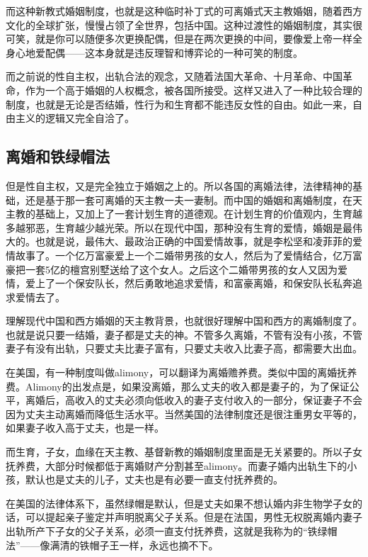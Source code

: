 而这种新教式婚姻制度，也就是这种临时补丁式的可离婚式天主教婚姻，随着西方文化的全球扩张，慢慢占领了全世界，包括中国。这种过渡性的婚姻制度，其实很可笑，就是你可以随便多次更换配偶，但是在两次更换的中间，要像爱上帝一样全身心地爱配偶——这本身就是违反理智和博弈论的一种可笑的制度。

而之前说的性自主权，出轨合法的观念，又随着法国大革命、十月革命、中国革命，作为一个高于婚姻的人权概念，被各国所接受。这样又进入了一种比较合理的制度，也就是无论是否结婚，性行为和生育都不能违反女性的自由。如此一来，自由主义的逻辑又完全自洽了。

\subsection{离婚和铁绿帽法}

但是性自主权，又是完全独立于婚姻之上的。所以各国的离婚法律，法律精神的基础，还是基于那一套可离婚的天主教一夫一妻制。而中国的婚姻和离婚制度，在天主教的基础上，又加上了一套计划生育的道德观。在计划生育的价值观内，生育越多越邪恶，生育越少越光荣。所以在现代中国，那种没有生育的爱情，婚姻是最伟大的。也就是说，最伟大、最政治正确的中国爱情故事，就是李松坚和凌菲菲的爱情故事了。一个亿万富豪爱上一个二婚带男孩的女人，然后为了爱情结合，亿万富豪把一套5亿的檀宫别墅送给了这个女人。之后这个二婚带男孩的女人又因为爱情，爱上了一个保安队长，然后勇敢地追求爱情，和富豪离婚，和保安队长私奔追求爱情去了。

理解现代中国和西方婚姻的天主教背景，也就很好理解中国和西方的离婚制度了。也就是说只要一结婚，妻子都是丈夫的神。不管多久离婚，不管有没有小孩，不管妻子有没有出轨，只要丈夫比妻子富有，只要丈夫收入比妻子高，都需要大出血。

在美国，有一种制度叫做alimony，可以翻译为离婚赡养费。类似中国的离婚抚养费。Alimony的出发点是，如果没离婚，那么丈夫的收入都是妻子的，为了保证公平，离婚后，高收入的丈夫必须向低收入的妻子支付收入的一部分，保证妻子不会因为丈夫主动离婚而降低生活水平。当然美国的法律制度还是很注重男女平等的，如果妻子收入高于丈夫，也是一样。

而生育，子女，血缘在天主教、基督新教的婚姻制度里面是无关紧要的。所以子女抚养费，大部分时候都低于离婚财产分割甚至alimony。而妻子婚内出轨生下的小孩，默认也是丈夫的儿子，丈夫也是有必要一直支付抚养费的。

在美国的法律体系下，虽然绿帽是默认，但是丈夫如果不想认婚内非生物学子女的话，可以提起亲子鉴定并声明脱离父子关系。但是在法国，男性无权脱离婚内妻子出轨所产下子女的父子关系，必须一直支付抚养费，这就是我称为的``铁绿帽法''——像满清的铁帽子王一样，永远也摘不下。


